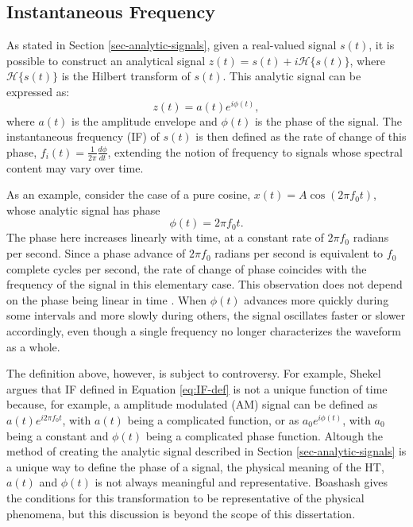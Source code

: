\subsection{Instantaneous Frequency}\label{sec-IF}

As stated in Section \ref{sec-analytic-signals}, given a real-valued signal $s(t)$, it is possible to construct an analytical signal $z(t)=s(t)+i\mathcal{H}\{s(t)\}$, where $\mathcal{H}\{s(t)\}$ is the Hilbert transform of $s(t)$. This analytic signal can be expressed as:
\begin{equation}
    z(t) = a(t) e^{i\phi(t)},
\end{equation}
\noindent where $a(t)$ is the amplitude envelope and $\phi(t)$ is the phase of the signal. The instantaneous frequency (IF) of $s(t)$ is then defined as the rate of change of this phase, $f_i(t) = \frac{1}{2\pi}\frac{d\phi}{dt}$, extending the notion of frequency to signals whose spectral content may vary over time. 

As an example, consider the case of a pure cosine, $x(t) = A\cos(2\pi f_0 t)$, whose analytic signal has phase
\begin{equation}
    \phi(t) = 2\pi f_0 t.
    \label{eq:IF-def}
\end{equation}
The phase here increases linearly with time, at a constant rate of $2\pi f_0$ radians per second. Since a phase advance of $2\pi f_0$ radians per second is equivalent to $f_0$ complete cycles per second, the rate of change of phase coincides with the frequency of the signal in this elementary case. This observation does not depend on the phase being linear in time \cite{Stankovi2014}. When $\phi(t)$ advances more quickly during some intervals and more slowly during others, the signal oscillates faster or slower accordingly, even though a single frequency no longer characterizes the waveform as a whole.
 
The definition above, however, is subject to controversy. For example, Shekel \cite{shekel1953instantaneous} argues that IF defined in Equation \ref{eq:IF-def} is not a unique function of time because, for example, a amplitude modulated (AM) signal can be defined as $a(t)e^{i2\pi f_0 t}$, with $a(t)$ being a complicated function, or as $a_0 e^{i\phi(t)}$, with $a_0$ being a constant and $\phi(t)$ being a complicated phase function. Altough the method of creating the analytic signal described in Section \ref{sec-analytic-signals} is a unique way to define the phase of a signal, the physical meaning of the HT, $a(t)$ and $\phi(t)$ is not always meaningful and representative. Boashash \cite{boashash1992estimating} gives the conditions for this transformation to be representative of the physical phenomena, but this discussion is beyond the scope of this dissertation.

